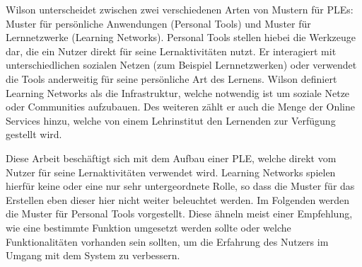 Wilson unterscheidet zwischen zwei verschiedenen Arten von Mustern für PLEs: Muster für persönliche Anwendungen (Personal Tools) und Muster für Lernnetzwerke (Learning Networks). Personal Tools stellen hiebei die Werkzeuge dar, die ein Nutzer direkt für seine Lernaktivitäten nutzt. Er interagiert mit unterschiedlichen sozialen Netzen (zum Beispiel Lernnetzwerken) oder verwendet die Tools anderweitig für seine persönliche Art des Lernens. 
Wilson definiert Learning Networks als die Infrastruktur, welche notwendig ist um soziale Netze oder Communities aufzubauen. Des weiteren zählt er auch die Menge der Online Services hinzu, welche von einem Lehrinstitut den Lernenden zur Verfügung gestellt wird.

Diese Arbeit beschäftigt sich mit dem Aufbau einer PLE, welche direkt vom Nutzer für seine Lernaktivitäten verwendet wird. Learning Networks spielen hierfür keine oder eine nur sehr untergeordnete Rolle, so dass die Muster für das Erstellen eben dieser hier nicht weiter beleuchtet werden. Im Folgenden werden die Muster für Personal Tools vorgestellt. Diese ähneln meist einer Empfehlung, wie eine bestimmte Funktion umgesetzt werden sollte oder welche Funktionalitäten vorhanden sein sollten, um die Erfahrung des Nutzers im Umgang mit dem System zu verbessern.

